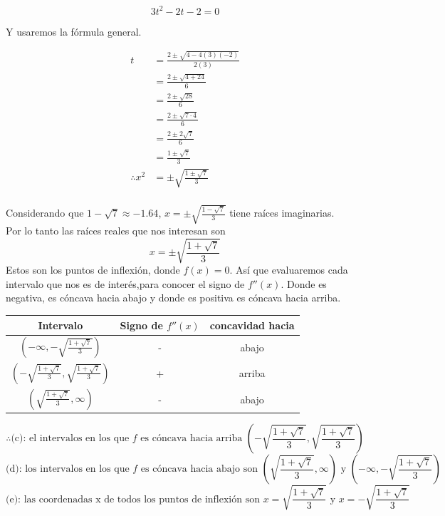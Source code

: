 \documentclass[12pt]{article}
\begin{document}
\[ 3t^{2} - 2t - 2 = 0 \]

Y usaremos la fórmula general.

 \begin{equation*}
  \begin{split}
    t
    &=  \frac{2 \pm \sqrt{4-4(3)(-2)} }{2(3)}  \\
    &=  \frac{2 \pm \sqrt{4+24} }{6}  \\
    &=  \frac{2 \pm \sqrt{28} }{6}  \\
    &=  \frac{2 \pm \sqrt{7 \cdot 4} }{6}  \\
    &=  \frac{2 \pm 2 \sqrt{7} }{6}  \\
    &=  \frac{1 \pm \sqrt{7} }{3}  \\
    \therefore
    x^{2}
    &= \pm \sqrt { \frac {1 \pm \sqrt { 7 } } { 3 }  } \\
  \end{split}
 \end{equation*}

Considerando que $1 -  \sqrt{7} \approx -1.64$, $x = \pm \sqrt {\frac{1 - \sqrt{7}}{3}}$ tiene raíces imaginarias.\\
Por lo tanto las raíces reales que nos interesan son
  \[
  x = \pm \sqrt {\frac{1 + \sqrt{7} }{3}} 
  \]
Estos son los puntos de inflexión, donde $f(x) = 0$. Así que evaluaremos cada intervalo que nos es de interés,para conocer el signo de $ f''(x) $. Donde es negativa, es cóncava hacia abajo y donde es positiva es cóncava hacia arriba.
  
\begin{table}[h]
\centering
\begin{tabular}{|c|c|c|}
\hline
Intervalo &  Signo de $f''(x)$ & concavidad hacia \\
\hline
$(-\infty, -\sqrt{\frac{1 + \sqrt{7}}{3}})$ & - & abajo\\
\hline
$(-\sqrt{\frac{1 + \sqrt{7}}{3}}, \sqrt{\frac{1 + \sqrt{7}}{3}})$ & + & arriba \\
\hline
$(\sqrt{\frac{1 + \sqrt{7}}{3}}, \infty)$ & - & abajo \\
\hline
\end{tabular}
\end{table}

 \[
 \therefore
 \text{(c):  el intervalos  en los que $f$ es cóncava hacia arriba } (-\sqrt{\frac{1 + \sqrt{7}}{3}}, \sqrt{\frac{1 + \sqrt{7}}{3}})
   \]
\[
  \text {(d):  los  intervalos en los que $f$  es cóncava hacia abajo  son }  (\sqrt{\frac{1 + \sqrt{7}}{3}}, \infty) \text{ y } (-\infty, -\sqrt{\frac{1 + \sqrt{7}}{3}})

    \]
\[
  \text {(e): las coordenadas x de todos los puntos de inflexión son }  x =  \sqrt {\frac{1 + \sqrt{7} }{3}}  \text{ y }  x = - \sqrt {\frac{1 + \sqrt{7} }{3}} 

    \]
\end{document}
